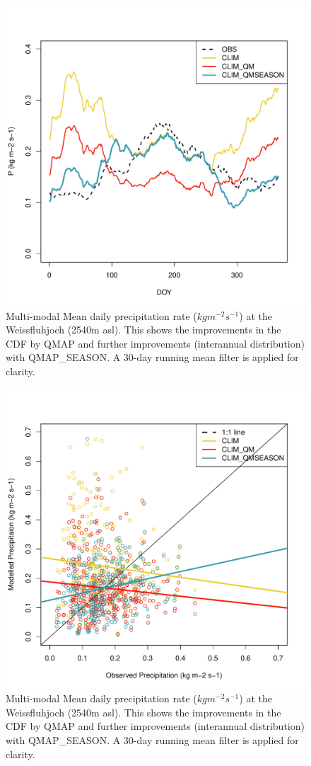 \documentclass[hess, manuscript]{copernicus}
\begin{document}
\begin{figure}[t]
\includegraphics[width=12cm]{"plots/P_DOY.pdf"}
\caption{Multi-modal Mean daily precipitation rate ($kg m^{-2} s^{-1}$) at the Weissfluhjoch (2540m asl). This shows the improvements in the CDF by QMAP and further improvements (interannual distribution) with QMAP\_SEASON. A 30-day running mean filter is applied for clarity. }
\end{figure}

\begin{figure}[t]
\includegraphics[width=12cm]{"plots/P_SCATTER.pdf"}
\caption{Multi-modal Mean daily precipitation rate ($kg m^{-2} s^{-1}$) at the Weissfluhjoch (2540m asl). This shows the improvements in the CDF by QMAP and further improvements (interannual distribution) with QMAP\_SEASON. A 30-day running mean filter is applied for clarity. }
\end{figure}
\end{document}

